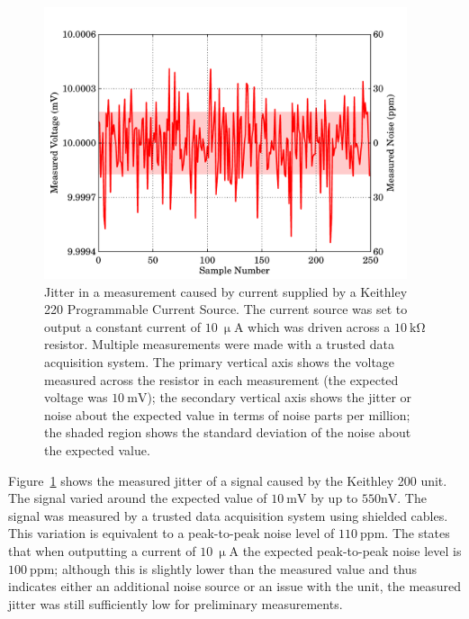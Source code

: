 \begin{figure}[t]
\begin{center}
\includegraphics[width = 0.95\textwidth]{figures/keithley220_jitter}
\caption[Jitter from a Keithley 220 Current Source]{Jitter in a measurement caused by current supplied by a Keithley 220 Programmable Current Source. The current source was set to output a constant current of $10~\mathrm{\upmu A}$ which was driven across a $10~\mathrm{k\Omega}$ resistor. Multiple measurements were made with a trusted data acquisition system. The primary vertical axis shows the voltage measured across the resistor in each measurement (the expected voltage was $10~\mathrm{mV}$); the secondary vertical axis shows the jitter or noise about the expected value in terms of noise parts per million; the shaded region shows the standard deviation of the noise about the expected value.}
\label{fig:Keithley220_jitter}
\end{center}
\end{figure}
\par 
Figure~\ref{fig:Keithley220_jitter} shows the measured jitter of a signal caused by the Keithley 200 unit. The signal varied around the expected value of $10~\mathrm{mV}$ by up to $550\mathrm{nV}$. The signal was measured by a trusted data acquisition system using shielded cables. This variation is equivalent to a peak-to-peak noise level of $110~\mathrm{ppm}$. The \textcite{Keithley220DS} states that when outputting a current of $10~\mathrm{\upmu A}$ the expected peak-to-peak noise level is $100~\mathrm{ppm}$; although this is slightly lower than the measured value and thus indicates either an additional noise source or an issue with the unit, the measured jitter was still sufficiently low for preliminary measurements. 
